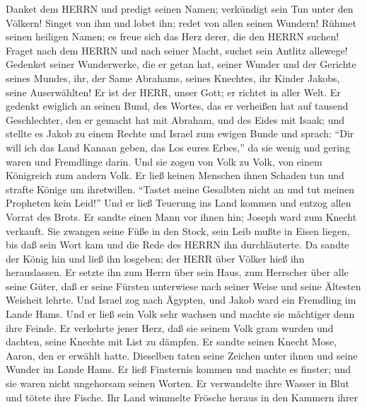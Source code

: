  Danket dem HERRN und predigt seinen Namen; verkündigt sein
Tun unter den Völkern!  Singet von ihm und lobet ihn; redet
von allen seinen Wundern!  Rühmet seinen heiligen Namen; es
freue sich das Herz derer, die den HERRN suchen!  Fraget
nach dem HERRN und nach seiner Macht, suchet sein Antlitz allewege!
 Gedenket seiner Wunderwerke, die er getan hat, seiner
Wunder und der Gerichte seines Mundes,  ihr, der Same
Abrahams, seines Knechtes, ihr Kinder Jakobs, seine Auserwählten!
 Er ist der HERR, unser Gott; er richtet in aller Welt.
 Er gedenkt ewiglich an seinen Bund, des Wortes, das er
verheißen hat auf tausend Geschlechter,  den er gemacht hat
mit Abraham, und des Eides mit Isaak;  und stellte es Jakob
zu einem Rechte und Israel zum ewigen Bunde  und sprach:
``Dir will ich das Land Kanaan geben, das Los eures Erbes,''
 da sie wenig und gering waren und Fremdlinge darin.
 Und sie zogen von Volk zu Volk, von einem Königreich zum
andern Volk.  Er ließ keinen Menschen ihnen Schaden tun und
strafte Könige um ihretwillen.  ``Tastet meine Gesalbten
nicht an und tut meinen Propheten kein Leid!''  Und er ließ
Teuerung ins Land kommen und entzog allen Vorrat des Brots.
 Er sandte einen Mann vor ihnen hin; Joseph ward zum Knecht
verkauft.  Sie zwangen seine Füße in den Stock, sein Leib
mußte in Eisen liegen,  bis daß sein Wort kam und die Rede
des HERRN ihn durchläuterte.  Da sandte der König hin und
ließ ihn losgeben; der HERR über Völker hieß ihn herauslassen.
 Er setzte ihn zum Herrn über sein Haus, zum Herrscher über
alle seine Güter,  daß er seine Fürsten unterwiese nach
seiner Weise und seine Ältesten Weisheit lehrte.  Und
Israel zog nach Ägypten, und Jakob ward ein Fremdling im Lande Hams.
 Und er ließ sein Volk sehr wachsen und machte sie
mächtiger denn ihre Feinde.  Er verkehrte jener Herz, daß
sie seinem Volk gram wurden und dachten, seine Knechte mit List zu
dämpfen.  Er sandte seinen Knecht Mose, Aaron, den er
erwählt hatte.  Dieselben taten seine Zeichen unter ihnen
und seine Wunder im Lande Hams.  Er ließ Finsternis kommen
und machte es finster; und sie waren nicht ungehorsam seinen Worten.
 Er verwandelte ihre Wasser in Blut und tötete ihre Fische.
 Ihr Land wimmelte Frösche heraus in den Kammern ihrer
